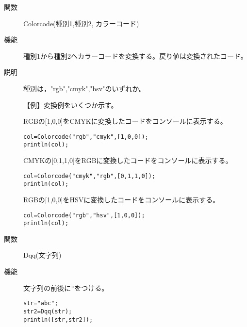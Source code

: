 \documentclass[papersize,a4paper,10pt,uplatex]{jsarticle}
\begin{document}
\begin{description}
\begin{comment}
\vspace{\baselineskip}
\hypertarget{com2nd}{}
\item[関数]Com2nd(文字列）
\item[機能]RのOpenfileのあとに置くコマンド（文字列）を定義する。


\vspace{\baselineskip}
\hypertarget{com2ndpre}{}
\item[関数]Com2ndpre(文字列）
\item[機能]RのOpenfileのあとに置くコマンド（文字列）を定義する。

Openfileの直後（グループの先頭に）書き出す。
\end{comment}


\hypertarget{colorcode}{}
\item[関数]Colorcode(種別1,種別2, カラーコード)
\item[機能]種別1から種別2へカラーコードを変換する。戻り値は変換されたコード。
\item[説明]種別は，"rgb","cmyk","hsv"のいずれか。

\vspace{\baselineskip}
【例】変換例をいくつか示す。

RGBの[1,0,0]をCMYKに変換したコードをコンソールに表示する。
\begin{verbatim}
col=Colorcode("rgb","cmyk",[1,0,0]); 
println(col); 
\end{verbatim}

CMYKの[0,1,1,0]をRGBに変換したコードをコンソールに表示する。

\begin{verbatim}
col=Colorcode("cmyk","rgb",[0,1,1,0]);
println(col); 
\end{verbatim}

RGBの[1,0,0]をHSVに変換したコードをコンソールに表示する。

\begin{verbatim}
col=Colorcode("rgb","hsv",[1,0,0]);
println(col); 
\end{verbatim}

\vspace{\baselineskip}
\hypertarget{dqq}{}
\item[関数]Dqq(文字列)
\item[機能]文字列の前後に\verb|"|をつける。
\begin{verbatim}
str="abc";
str2=Dqq(str);
println([str,str2]); 
\end{verbatim}


\end{description}
\end{document}

